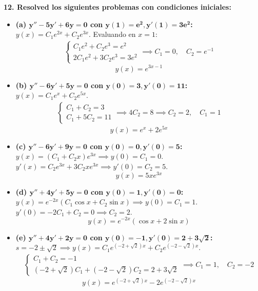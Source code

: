 \documentclass[11pt, a4paper]{article}
\begin{document}
\noindent\textbf{12. Resolved los siguientes problemas con condiciones iniciales:}

\begin{itemize}
\item \textbf{(a) $\bm{y''-5y'+6y=0}$ con $\bm{y(1)=e^2, y'(1)=3e^2}$:} \\
$y(x) = C_1 e^{2x} + C_2 e^{3x}$. Evaluando en $x=1$:
\begin{align*}
\begin{cases} C_1 e^2 + C_2 e^3 = e^2 \\ 2C_1 e^2 + 3C_2 e^3 = 3e^2 \end{cases} \implies C_1 = 0, \quad C_2 = e^{-1}
\end{align*}
\[
\boxed{y(x) = e^{3x-1}}
\]

\item \textbf{(b) $\bm{y''-6y'+5y=0}$ con $\bm{y(0)=3, y'(0)=11}$:} \\
$y(x) = C_1 e^x + C_2 e^{5x}$.
\begin{align*}
\begin{cases} C_1 + C_2 = 3 \\ C_1 + 5C_2 = 11 \end{cases} \implies 4C_2 = 8 \implies C_2 = 2, \quad C_1 = 1
\end{align*}
\[
\boxed{y(x) = e^x + 2e^{5x}}
\]

\item \textbf{(c) $\bm{y''-6y'+9y=0}$ con $\bm{y(0)=0, y'(0)=5}$:} \\
$y(x) = (C_1 + C_2 x)e^{3x} \implies y(0) = C_1 = 0$. $y'(x) = C_2 e^{3x} + 3C_2 x e^{3x} \implies y'(0) = C_2 = 5$.
\[
\boxed{y(x) = 5x e^{3x}}
\]

\item \textbf{(d) $\bm{y''+4y'+5y=0}$ con $\bm{y(0)=1, y'(0)=0}$:} \\
$y(x) = e^{-2x}(C_1 \cos x + C_2 \sin x) \implies y(0) = C_1 = 1$. \\
$y'(0) = -2C_1 + C_2 = 0 \implies C_2 = 2$.
\[
\boxed{y(x) = e^{-2x}(\cos x + 2\sin x)}
\]

\item \textbf{(e) $\bm{y''+4y'+2y=0}$ con $\bm{y(0)=-1, y'(0)=2+3\sqrt{2}}$:} \\
$s = -2 \pm \sqrt{2} \implies y(x) = C_1 e^{(-2+\sqrt{2})x} + C_2 e^{(-2-\sqrt{2})x}$.
\begin{align*}
\begin{cases} C_1 + C_2 = -1 \\ (-2+\sqrt{2})C_1 + (-2-\sqrt{2})C_2 = 2+3\sqrt{2} \end{cases} \implies C_1 = 1, \quad C_2 = -2
\end{align*}
\[
\boxed{y(x) = e^{(-2+\sqrt{2})x} - 2e^{(-2-\sqrt{2})x}}
\]


\end{itemize}
\end{document}
